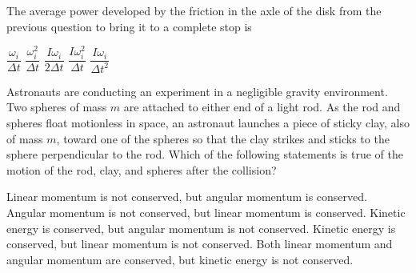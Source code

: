 \documentclass{../../oss-classkick-exam}
\begin{document}
\begin{multicols*}{2}
\begin{questions}
  \question The average power developed by the friction in the axle of the disk
    from the previous question to bring it to a complete stop is
    \begin{choices}
      \choice $\dfrac{\omega_i}{\Delta t}$
      \choice $\dfrac{\omega_i^2}{\Delta t}$
      \choice $\dfrac{I\omega_i}{2\Delta t}$
      \choice $\dfrac{I\omega_i^2}{\Delta t}$
      \choice $\dfrac{I\omega_i}{\Delta t^2}$
    \end{choices}    

    \question Astronauts are conducting an experiment in a negligible gravity
    environment. Two spheres of mass $m$ are attached to either end of a light
    rod. As the rod and spheres float motionless in space, an astronaut
    launches a piece of sticky clay, also of mass $m$, toward one of the spheres
    so that the clay strikes and sticks to the sphere perpendicular to the rod.
    Which of the following statements is true of the motion of the rod, clay,
    and spheres after the collision?
    \begin{center}
    \end{center}
    \begin{choices}
      \choice Linear momentum is not conserved, but angular momentum is
      conserved.
      \choice Angular momentum is not conserved, but linear momentum is
      conserved.
      \choice Kinetic energy is conserved, but angular momentum is not
      conserved.
      \choice Kinetic energy is conserved, but linear momentum is not conserved.
      \choice Both linear momentum and angular momentum are conserved, but
      kinetic energy is not conserved.
    \end{choices}
    \vspace{.7in}
    

\end{questions}
\end{multicols*}
\end{document}
